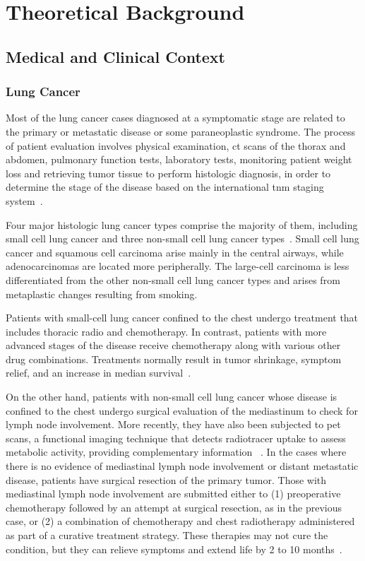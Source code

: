 \chapter{Theoretical Background}\label{chap:background}

\section{Medical and Clinical Context}\label{sec:med_context}

\subsection{Lung Cancer}

Most of the lung cancer cases diagnosed at a symptomatic stage are related to the primary or metastatic disease or some paraneoplastic syndrome. The process of patient evaluation involves physical examination, \ac{ct} scans of the thorax and abdomen, pulmonary function tests, laboratory tests, monitoring patient weight loss and retrieving tumor tissue to perform histologic diagnosis, in order to determine the stage of the disease based on the international \ac{tnm} staging system~\cite{minna_focus_2002, watanabe_tnm_2003}.

Four major histologic lung cancer types comprise the majority of them, including small cell lung cancer and three non-small cell lung cancer types~\cite{travis_pathology_2011}.
Small cell lung cancer and squamous cell carcinoma arise mainly in the central airways, while adenocarcinomas are located more peripherally. The large-cell carcinoma is less differentiated from the other non-small cell lung cancer types and arises from metaplastic changes resulting from smoking.

Patients with small-cell lung cancer confined to the chest undergo treatment that includes thoracic radio and chemotherapy. In contrast, patients with more advanced stages of the disease receive chemotherapy along with various other drug combinations. Treatments normally result in tumor shrinkage, symptom relief, and an increase in median survival~\cite{minna_focus_2002}.

On the other hand, patients with non-small cell lung cancer whose disease is confined to the chest undergo surgical evaluation of the mediastinum to check for lymph node involvement. More recently, they have also been subjected to \ac{pet} scans, a functional imaging technique that detects radiotracer uptake to assess metabolic activity, providing complementary information ~\cite{buzug_computed_2011}.
In the cases where there is no evidence of mediastinal lymph node involvement or distant metastatic disease, patients have surgical resection of the primary tumor. Those with mediastinal lymph node involvement are submitted either to (1) preoperative chemotherapy followed by an attempt at surgical resection, as in the previous case, or (2) a combination of chemotherapy and chest radiotherapy administered as part of a curative treatment strategy. These therapies may not cure the condition, but they can relieve symptoms and extend life by 2 to 10 months~\cite{minna_focus_2002}.


